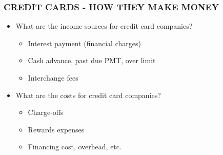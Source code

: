 \documentclass[12pt]{article}
\begin{document}
                \subsubsection{CREDIT CARDS - HOW THEY MAKE MONEY}
                    \begin{itemize}
                        \item What are the income sources for credit card companies?
                            \begin{itemize}
                                \item Interest payment (financial charges)
                                \item Cash advance, past due PMT, over limit
                                \item Interchange fees
                            \end{itemize}
                        \item What are the costs for credit card companies?
                            \begin{itemize}
                                \item Charge-offs
                                \item Rewards expenses
                                \item Financing cost, overhead, etc.
                            \end{itemize}
                    \end{itemize}
\end{document}
